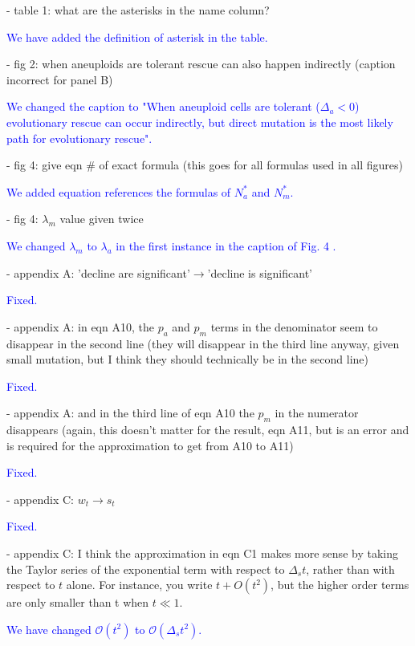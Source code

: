 \documentclass[12pt]{extarticle}
\begin{document}
- table 1: what are the asterisks in the name column?

\textcolor{blue}{%
We have added the definition of asterisk in the table.
} 

- fig 2: when aneuploids are tolerant rescue can also happen indirectly (caption incorrect for panel B)

\textcolor{blue}{%
We changed the caption to "When aneuploid cells are tolerant ($\Delta_a<0$) evolutionary rescue can occur indirectly, but direct mutation is the most likely path for evolutionary rescue".
} 

- fig 4: give eqn $\#$ of exact formula (this goes for all formulas used in all figures)

\textcolor{blue}{%
We added equation references the formulas of $N_a^*$ and $N_m^*$.
} 

- fig 4: $\lambda_m$ value given twice

\textcolor{blue}{%
We changed $\lambda_m$ to $\lambda_a$ in the first instance in the caption of Fig. 4 .
} 

- appendix A: 'decline are significant'$\rightarrow$'decline is significant'

\textcolor{blue}{Fixed.}  %

- appendix A: in eqn A10, the $p_a$ and $p_m$ terms in the denominator seem to disappear in the second line (they will disappear in the third line anyway, given small mutation, but I think they should technically be in the second line)

\textcolor{blue}{Fixed.} %

- appendix A: and in the third line of eqn A10 the $p_m$ in the numerator disappears (again, this doesn't matter for the result, eqn A11, but is an error and is required for the approximation to get from A10 to A11)

\textcolor{blue}{Fixed.} %

- appendix C: $w_t\rightarrow s_t$

\textcolor{blue}{Fixed.} %

- appendix C: I think the approximation in eqn C1 makes more sense by taking the Taylor series of the exponential term with respect to $\Delta_st$, rather than with respect to $t$ alone. For instance, you write $t + O(t^2)$, but the higher order terms are only smaller than t when $t\ll1$.

\textcolor{blue}{We have changed $\mathcal{O}\left(t^2\right)$ to $\mathcal{O}\left(\Delta_st^2\right)$. } %
\end{document}
